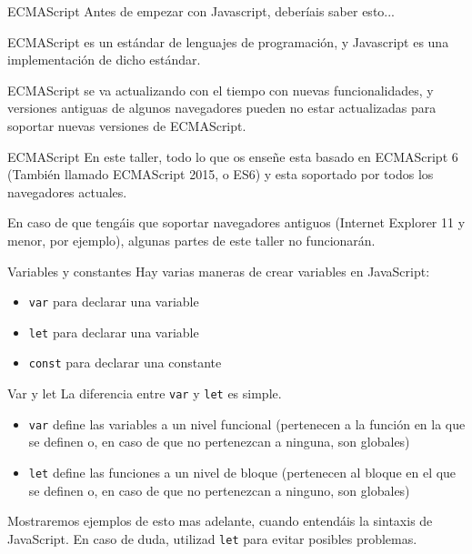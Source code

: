 \documentclass{beamer}
\begin{document}
\begin{frame}{ECMAScript}
Antes de empezar con Javascript, deberíais saber esto...

ECMAScript es un estándar de lenguajes de programación, y Javascript es una implementación de dicho estándar.

ECMAScript se va actualizando con el tiempo con nuevas funcionalidades, y versiones antiguas de algunos navegadores pueden no estar actualizadas para soportar nuevas versiones de ECMAScript.
\end{frame}

\begin{frame}{ECMAScript}
En este taller, todo lo que os enseñe esta basado en ECMAScript 6 (También llamado ECMAScript 2015, o ES6) y esta soportado por todos los navegadores actuales.

En caso de que tengáis que soportar navegadores antiguos (Internet Explorer 11 y menor, por ejemplo), algunas partes de este taller no funcionarán.
\end{frame}

\begin{frame}[fragile]{Variables y constantes}
Hay varias maneras de crear variables en JavaScript:
\begin{itemize}
    \item {\verb|var|} para declarar una variable 
    \item {\verb|let|} para declarar una variable
    \item {\verb|const|} para declarar una constante
\end{itemize}

\end{frame}

\begin{frame}[fragile]{Var y let}
La diferencia entre {\verb|var|} y {\verb|let|} es simple.
\begin{itemize}
    \item {\verb|var|} define las variables a un nivel funcional (pertenecen a la función en la que se definen o, en caso de que no pertenezcan a ninguna, son globales)
    
    \item {\verb|let|} define las funciones a un nivel de bloque (pertenecen al bloque en el que se definen o, en caso de que no pertenezcan a ninguno, son globales)
\end{itemize}

Mostraremos ejemplos de esto mas adelante, cuando entendáis la sintaxis de JavaScript. En caso de duda, utilizad {\verb|let|} para evitar posibles problemas.
\end{frame}
\end{document}
